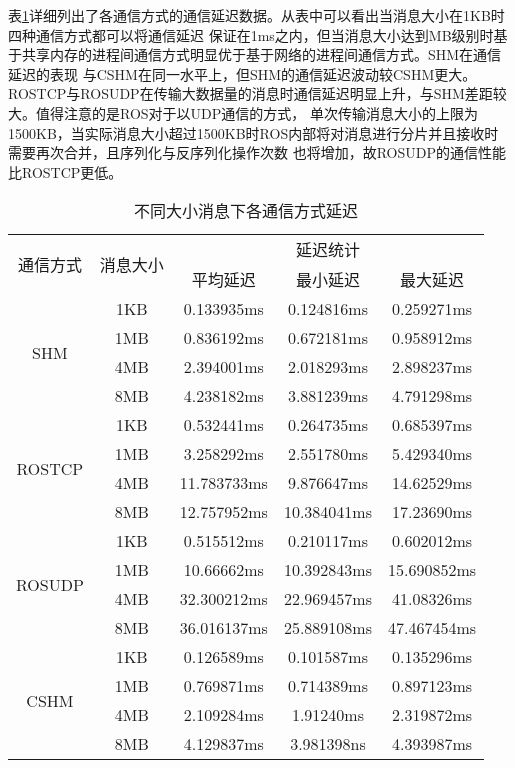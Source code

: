 表\ref{one_to_one}详细列出了各通信方式的通信延迟数据。从表中可以看出当消息大小在1KB时四种通信方式都可以将通信延迟
保证在1ms之内，但当消息大小达到MB级别时基于共享内存的进程间通信方式明显优于基于网络的进程间通信方式。SHM在通信延迟的表现
与CSHM在同一水平上，但SHM的通信延迟波动较CSHM更大。ROSTCP与ROSUDP在传输大数据量的消息时通信延迟明显上升，与SHM差距较大。值得注意的是ROS对于以UDP通信的方式，
单次传输消息大小的上限为1500KB，当实际消息大小超过1500KB时ROS内部将对消息进行分片并且接收时需要再次合并，且序列化与反序列化操作次数
也将增加，故ROSUDP的通信性能比ROSTCP更低。
\begin{table}[htb]
  \centering\small
  \caption{不同大小消息下各通信方式延迟}
  \renewcommand\arraystretch{1.2}
  \label{one_to_one}
  \begin{tabular}{ccccc}
    \toprule
    \multirow{2}{*}{通信方式} & \multirow{2}{*}{消息大小} & \multicolumn{3}{c}{延迟统计}\\
    \cline{3-5}
     & & 平均延迟 & 最小延迟 & 最大延迟\\
    \midrule
    \multirow{4}{*}{SHM} & 1KB& 0.133935ms& 0.124816ms& 0.259271ms\\ & 1MB & 0.836192ms & 0.672181ms & 0.958912ms \\ & 4MB & 2.394001ms & 2.018293ms & 2.898237ms \\ & 8MB & 4.238182ms & 3.881239ms & 4.791298ms\\
    \hline
    \multirow{4}{*}{ROSTCP} & 1KB& 0.532441ms& 0.264735ms& 0.685397ms\\ & 1MB & 3.258292ms & 2.551780ms & 5.429340ms \\ & 4MB & 11.783733ms & 9.876647ms & 14.62529ms \\ & 8MB & 12.757952ms & 10.384041ms & 17.23690ms\\
    \hline
    \multirow{4}{*}{ROSUDP} & 1KB& 0.515512ms& 0.210117ms& 0.602012ms\\ & 1MB & 10.66662ms & 10.392843ms & 15.690852ms \\ & 4MB & 32.300212ms & 22.969457ms & 41.08326ms \\ & 8MB & 36.016137ms & 25.889108ms & 47.467454ms\\
    \hline
    \multirow{4}{*}{CSHM} & 1KB& 0.126589ms& 0.101587ms& 0.135296ms\\ & 1MB & 0.769871ms & 0.714389ms & 0.897123ms \\ & 4MB & 2.109284ms & 1.91240ms & 2.319872ms \\ & 8MB & 4.129837ms & 3.981398ns & 4.393987ms\\
    \bottomrule
  \end{tabular}
\end{table}


